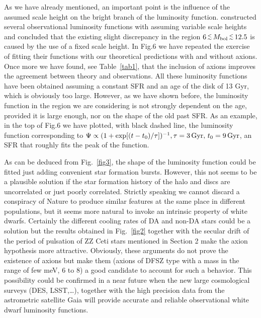 \documentclass[useAMS,usenatbib]{mnras}
\newcommand{\lppr}{\stackrel{<}{\scriptstyle \sim}}
\newcommand{\lappr}{\raisebox{-0.4ex}{$\lppr$}}
\begin{document}
As we have already mentioned, an important point is the influence of the assumed scale 
height on the bright branch of the luminosity function. \citet{kili17} constructed several 
observational  luminosity functions with assuming variable scale heights and concluded 
that the existing slight discrepancy in the region  $6\, \lappr \, M_{\rm bol} \, \lappr \, 12.5$ 
is caused by the use of a fixed scale height. In Fig.6 we have repeated the exercise of fitting 
their functions with our theoretical predictions with and without axions. Once more we have found, see Table~\ref{tab1}, that the inclusion of axions improves the agreement between theory and observations. All these luminosity functions have been obtained assuming a constant SFR and an age of the disk of 13 Gyr, which is obviously too large. However, as we have shown before, the luminosity function in the region we are considering is not strongly dependent on the age, provided it is large enough, nor on the shape of the old past SFR. As an example, in the top of Fig.6 we have plotted, with black dashed line, the luminosity function corresponding to 
$\Psi \propto (1+\exp [(t-t_0)/\tau])^{-1}, \tau = 3 \, {\rm Gyr},\, t_0= 9\,{\rm Gyr}$,
an SFR that roughly fits the peak of the function.

As can be deduced from Fig.~\ref{fig3}, the shape of the luminosity function could be
fitted just adding convenient star formation bursts. However, this not seems to be a plausible solution if the star formation history of the halo and discs are uncorrelated or just poorly correlated. Strictly speaking we cannot discard a conspiracy of Nature to produce similar features at the same place in different populations, but it seems more natural to invoke an intrinsic property of white dwarfs. Certainly the different cooling rates of DA and non-DA stars could be a solution but the results obtained in Fig.~\ref{fig2} together with the secular drift of the period of pulsation of ZZ Ceti stars mentioned in Section 2 make the axion hypothesis more attractive.
Obviously, these arguments do not  prove  the existence of axions but make them  (axions of DFSZ type with a mass in the range of few meV, 6 to 8)  a  good candidate  
to account  for such a behavior. This possibility  could be confirmed in a  near future when
the new  large cosmological  surveys (DES, LSST,\ldots),  together with the high precision  data from  the astrometric satellite  Gaia will provide  accurate and  reliable observational  white dwarf  luminosity functions.
\end{document}
